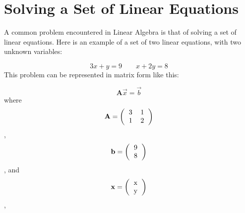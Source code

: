 \section{Solving a Set of Linear Equations}
A common problem encountered in Linear Algebra is that of solving a
set of linear equations.  Here is an example of a set of two linear
equations, with two unknown variables:

\begin{equation}
3 x + y = 9\qquad
x + 2 y = 8
\end{equation}
This problem can be represented
in matrix form like this:

\begin{equation}
\mathbf{A}\vec{x} = \vec{b}
\end{equation}
where
\begin{equation}
\mathbf{A} = \left( \begin{tabular}{cc}
3 & 1 \\
1 & 2 \\
\end{tabular}
\right)
\end{equation},
\begin{equation}
\vec{b} = \left( \begin{tabular}{c}
9  \\
8  \\
\end{tabular}
\right)
\end{equation},
and
\begin{equation}
\vec{x} = \left( \begin{tabular}{c}
x  \\
y  \\
\end{tabular}
\right)
\end{equation},

